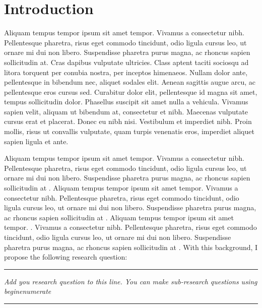 \documentclass[11pt]{report}
\newcommand{\HRule}[1]{\rule{\linewidth}{#1}}
\begin{document}
\section*{Introduction}


Aliquam tempus tempor ipsum sit amet tempor. Vivamus a consectetur nibh. Pellentesque pharetra, risus eget commodo tincidunt, odio ligula cursus leo, ut ornare mi dui non libero. Suspendisse pharetra purus magna, ac rhoncus sapien sollicitudin at. Cras dapibus vulputate ultricies. Class aptent taciti sociosqu ad litora torquent per conubia nostra, per inceptos himenaeos. Nullam dolor ante, pellentesque in bibendum nec, aliquet sodales elit. Aenean sagittis augue arcu, ac pellentesque eros cursus sed. Curabitur dolor elit, pellentesque id magna sit amet, tempus sollicitudin dolor. Phasellus suscipit sit amet nulla a vehicula. Vivamus sapien velit, aliquam ut bibendum at, consectetur et nibh. Maecenas vulputate cursus erat et placerat. Donec eu nibh nisi. Vestibulum et imperdiet nibh. Proin mollis, risus ut convallis vulputate, quam turpis venenatis eros, imperdiet aliquet sapien ligula et ante.  \cite{fukuyama2003our, kass2004president, sandel2004case}


Aliquam tempus tempor ipsum sit amet tempor. Vivamus a consectetur nibh. Pellentesque pharetra, risus eget commodo tincidunt, odio ligula cursus leo, ut ornare mi dui non libero. Suspendisse pharetra purus magna, ac rhoncus sapien sollicitudin at \cite{farah2004neurocognitive}. Aliquam tempus tempor ipsum sit amet tempor. Vivamus a consectetur nibh. Pellentesque pharetra, risus eget commodo tincidunt, odio ligula cursus leo, ut ornare mi dui non libero. Suspendisse pharetra purus magna, ac rhoncus sapien sollicitudin at \cite{ajax_2021}. Aliquam tempus tempor ipsum sit amet tempor. \cite{UEFAdoping}. Vivamus a consectetur nibh. Pellentesque pharetra, risus eget commodo tincidunt, odio ligula cursus leo, ut ornare mi dui non libero. Suspendisse pharetra purus magna, ac rhoncus sapien sollicitudin at \cite{petroczi2011impact, striegel2010randomized}. With this background, I propose the following research question:\\

\par\noindent\rule{\textwidth}{0.4pt}
\begin{center}
    \textit{Add you research question to this line. You can make sub-research questions using \\begin{enumerate}
         }
\end{center}
\par\noindent\rule{\textwidth}{0.4pt}
\end{document}
